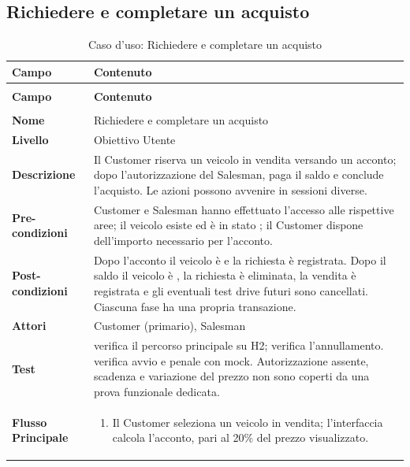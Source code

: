 \subsection{Richiedere e completare un acquisto}\label{sec:uc-acquisto}
\begin{xltabular}{\textwidth}{| >{\bfseries}p{.22\textwidth} | >{\raggedright\arraybackslash}X |}
\caption{Caso d'uso: Richiedere e completare un acquisto}\label{tab:uc-acquisto}\\
\hline
{} Campo & \textbf{Contenuto}\\\hline
\endfirsthead
{}\\
\hline
{} Campo & \textbf{Contenuto}\\\hline
\endhead
\hline
{}\\
\endfoot
\endlastfoot
Nome & Richiedere e completare un acquisto\\\hline
Livello & Obiettivo Utente\\\hline
Descrizione & Il Customer riserva un veicolo in vendita versando un acconto; dopo l'autorizzazione del Salesman, paga il saldo e conclude l'acquisto. Le azioni possono avvenire in sessioni diverse.\\\hline
Pre-condizioni & Customer e Salesman hanno effettuato l'accesso alle rispettive aree; il veicolo esiste ed è in stato ; il Customer dispone dell'importo necessario per l'acconto.\\\hline
Post-condizioni & Dopo l'acconto il veicolo è  e la richiesta è registrata. Dopo il saldo il veicolo è , la richiesta è eliminata, la vendita è registrata e gli eventuali test drive futuri sono cancellati. Ciascuna fase ha una propria transazione.\\\hline
Attori & Customer (primario), Salesman\\\hline
Test &  verifica il percorso principale su H2;  verifica l'annullamento.  verifica avvio e penale con mock. Autorizzazione assente, scadenza e variazione del prezzo non sono coperti da una prova funzionale dedicata.\\\hline
Flusso Principale &
\begin{enumerate}[label=\arabic*.,start=1,leftmargin=*,nosep]
  \item Il Customer seleziona un veicolo in vendita; l'interfaccia calcola l'acconto, pari al 20\% del prezzo visualizzato.

\end{enumerate}
\end{xltabular}
